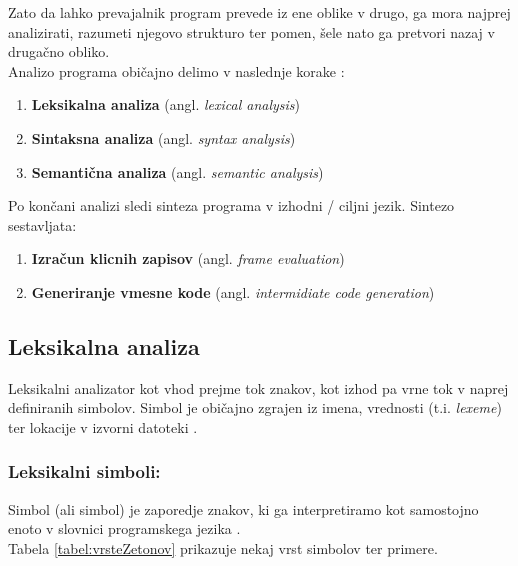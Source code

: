 \documentclass[a4paper, 12p]{book}
\begin{document}
Zato da lahko prevajalnik program prevede iz ene oblike v drugo, ga mora najprej analizirati, razumeti njegovo strukturo ter pomen, šele nato ga pretvori nazaj v drugačno obliko.  \\
Analizo programa običajno delimo v naslednje korake \cite{modernCompiler}:
\begin{enumerate}
	\item \textbf{Leksikalna analiza} (angl. \textit{lexical analysis})
	\item \textbf{Sintaksna analiza} (angl. \textit{syntax analysis})
	\item \textbf{Semantična analiza} (angl. \textit{semantic analysis})
\end{enumerate}

Po končani analizi sledi sinteza programa v izhodni / ciljni jezik. Sintezo sestavljata:
\begin{enumerate}
	\item \textbf{Izračun klicnih zapisov} (angl. \textit{frame evaluation})
	\item \textbf{Generiranje vmesne kode} (angl. \textit{intermidiate code generation})
\end{enumerate}

\subsection{Leksikalna analiza}

Leksikalni analizator kot vhod prejme tok znakov, kot izhod pa vrne tok v naprej definiranih simbolov. Simbol je običajno zgrajen iz imena, vrednosti (t.i. \textit{lexeme}) ter lokacije v izvorni datoteki \cite{modernCompiler}.

\subsubsection{Leksikalni simboli:}

Simbol (ali simbol) je zaporedje znakov, ki ga interpretiramo kot samostojno enoto v slovnici programskega jezika \cite{modernCompiler}. \\ 
Tabela \ref{tabel:vrsteZetonov} prikazuje nekaj vrst simbolov ter primere. \\
\end{document}
